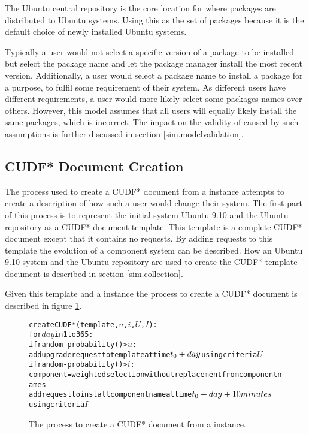 The Ubuntu central repository is the core location for where packages are distributed to Ubuntu systems.
Using this as the set of packages because it is the default choice of newly installed Ubuntu systems.

Typically a user would not select a specific version of a package to be installed but select the package name and let the package manager install the most recent version.
Additionally, a user would select a package name to install a package for a purpose, to fulfil some requirement of their system.
As different users have different requirements, a user would more likely select some packages names over others.
However, this model assumes that all users will equally likely install the same packages, which is incorrect.
The impact on the validity of \usermodel caused by such assumptions is further discussed in section \ref{sim.modelvalidation}.

\subsection{CUDF* Document Creation}
The process used to create a CUDF* document from a \usermodel instance attempts to create a description of how such a user would change their system.
The first part of this process is to represent the initial system Ubuntu 9.10 and the Ubuntu repository as a CUDF* document template.
This template is a complete CUDF* document except that it contains no requests.
By adding requests to this template the evolution of a component system can be described.
How an Ubuntu 9.10 system and the Ubuntu repository are used to create the CUDF* template document is described in section \ref{sim.collection}.

Given this template and a \usermodel instance the process to create a CUDF* document is described in figure \ref{sim.CUDF*}.
\begin{figure}[h]
\begin{center}
\begin{alltt}
createCUDF*(template, \( u\), \( i\), \( U\), \( I\)):
 for \(day\) in 1 to 365:
  if random-probability() > \( u\):
    add upgrade request to template at time \(t\sb{0}+day\) using criteria \(U\)
  if random-probability() > \( i\):  
   component = weighted selection without replacement from component names  
   add request to install component name at time \(t\sb{0}+day+10 minutes\) 
                                                      using criteria \(I\)
\end{alltt}
  \caption{The process to create a CUDF* document from a \usermodel instance.}
  \label{sim.CUDF*}
\end{center}
\end{figure}


